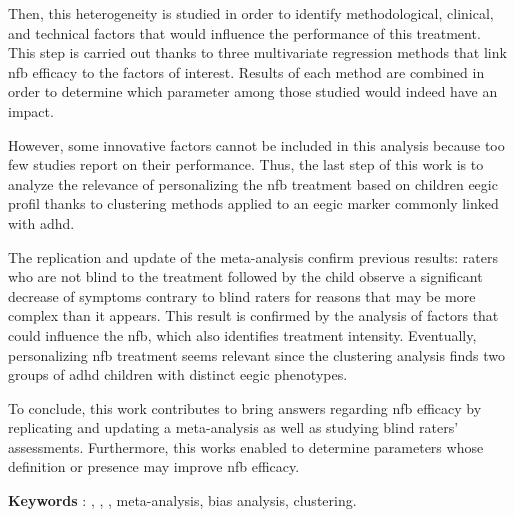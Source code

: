 Then, this heterogeneity is studied in order to identify methodological, clinical, and technical factors that would influence
the performance of this treatment. This step is carried out thanks to three multivariate regression methods that link \gls{nfb} 
efficacy to the factors of interest. Results of each method are combined in order to determine which parameter among those
studied would indeed have an impact. 

However, some innovative factors cannot be included in this analysis because too few studies report on their performance.
Thus, the last step of this work is to analyze the relevance of personalizing the \gls{nfb} treatment based on children \gls{eegic} profil
thanks to clustering methods applied to an \gls{eegic} marker commonly linked with \gls{adhd}.

The replication and update of the meta-analysis confirm previous results: raters who are not blind to the treatment
followed by the child observe a significant decrease of symptoms contrary to blind raters for reasons that may be more complex 
than it appears. This result is confirmed by the analysis of factors that could influence the \gls{nfb}, which also identifies 
treatment intensity. Eventually, personalizing \gls{nfb} treatment seems relevant since the clustering analysis finds two groups
of \gls{adhd} children with distinct \gls{eegic} phenotypes. 

To conclude, this work contributes to bring answers regarding \gls{nfb} efficacy by replicating and updating a meta-analysis as well 
as studying blind raters' assessments. Furthermore, this works enabled to determine parameters whose definition or presence may improve
\gls{nfb} efficacy.

\large{\textbf{Keywords}} : , , , meta-analysis, bias analysis, clustering.